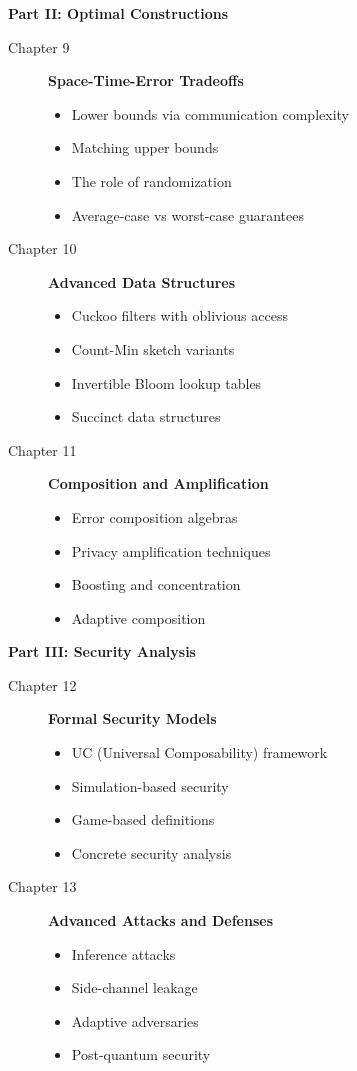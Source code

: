 \textbf{Part II: Optimal Constructions}
\begin{description}
\item[Chapter 9] \textbf{Space-Time-Error Tradeoffs}
    \begin{itemize}
    \item Lower bounds via communication complexity
    \item Matching upper bounds
    \item The role of randomization
    \item Average-case vs worst-case guarantees
    \end{itemize}

\item[Chapter 10] \textbf{Advanced Data Structures}
    \begin{itemize}
    \item Cuckoo filters with oblivious access
    \item Count-Min sketch variants
    \item Invertible Bloom lookup tables
    \item Succinct data structures
    \end{itemize}

\item[Chapter 11] \textbf{Composition and Amplification}
    \begin{itemize}
    \item Error composition algebras
    \item Privacy amplification techniques
    \item Boosting and concentration
    \item Adaptive composition
    \end{itemize}
\end{description}

\textbf{Part III: Security Analysis}
\begin{description}
\item[Chapter 12] \textbf{Formal Security Models}
    \begin{itemize}
    \item UC (Universal Composability) framework
    \item Simulation-based security
    \item Game-based definitions
    \item Concrete security analysis
    \end{itemize}

\item[Chapter 13] \textbf{Advanced Attacks and Defenses}
    \begin{itemize}
    \item Inference attacks
    \item Side-channel leakage
    \item Adaptive adversaries
    \item Post-quantum security
    \end{itemize}
\end{description}

